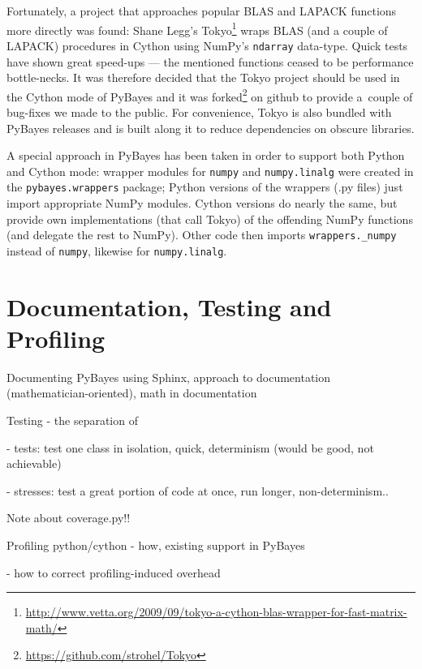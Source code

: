 Fortunately, a project that approaches popular BLAS and LAPACK functions more directly was found:
Shane Legg's Tokyo\footnote{\url{http://www.vetta.org/2009/09/tokyo-a-cython-blas-wrapper-for-fast-matrix-math/}}
wraps BLAS (and a couple of LAPACK) procedures in Cython using NumPy's \verb|ndarray| data-type.
Quick tests have shown great speed-ups --- the mentioned functions ceased to be performance
bottle-necks. It was therefore decided that the Tokyo project should be used in the Cython mode of
PyBayes and it was forked\footnote{\url{https://github.com/strohel/Tokyo}} on github to provide
a~couple of bug-fixes we made to the public. For convenience, Tokyo is also bundled with PyBayes
releases and is built along it to reduce dependencies on obscure libraries.

A special approach in PyBayes has been taken in order to support both Python and
Cython mode: wrapper modules for \verb|numpy| and \verb|numpy.linalg| were created in the
\verb|pybayes.wrappers| package; Python versions of the wrappers (.py files) just import appropriate
NumPy modules. Cython versions do nearly the same, but provide own implementations (that call Tokyo)
of the offending NumPy functions (and delegate the rest to NumPy). Other code then imports
\verb|wrappers._numpy| instead of \verb|numpy|, likewise for \verb|numpy.linalg|.

\section{Documentation, Testing and Profiling} \label{sec:PyBayesDocsTests}

Documenting PyBayes using Sphinx, approach to documentation (mathematician-oriented), math in documentation

Testing - the separation of

- tests: test one class in isolation, quick, determinism (would be good, not achievable)

- stresses: test a great portion of code at once, run longer, non-determinism..

Note about coverage.py!!

Profiling python/cython - how, existing support in PyBayes

- how to correct profiling-induced overhead


